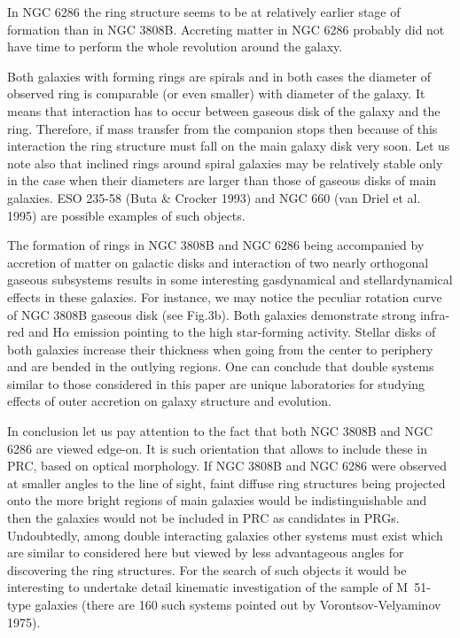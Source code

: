 In NGC 6286 the ring structure seems to be
at relatively earlier stage of formation than in NGC 3808B.
Accreting matter in NGC 6286 probably did not have time to perform 
the whole revolution around the galaxy.

Both galaxies with forming rings are spirals and in both
cases the diameter of observed ring is comparable (or
even smaller) with diameter of the galaxy. It means that
interaction has to occur between gaseous disk of the galaxy
and the ring. Therefore, if mass transfer from the companion
stops then because of this interaction the ring structure
must fall on the main galaxy disk very soon. Let us note also
that inclined rings around spiral galaxies may be relatively
stable only in the case when their diameters are larger than
those of gaseous disks of main galaxies. ESO 235-58 (Buta
\& Crocker 1993) and NGC 660 (van Driel et al. 1995) are
possible examples of such objects. 

The formation of rings in NGC 3808B and NGC 6286 being accompanied by
accretion of matter on galactic disks and interaction of two
nearly orthogonal gaseous subsystems results in some
interesting gasdynamical and stellardynamical effects in
these galaxies. For instance, we may notice the peculiar
rotation curve of NGC 3808B gaseous disk (see Fig.3b). Both
galaxies demonstrate strong infra-red and H$\alpha$
emission pointing to the high star-forming activity.
Stellar disks of both galaxies increase their thickness
when going from the center to periphery and are bended in the
outlying regions. One can conclude that double systems
similar to those considered in this paper are unique laboratories
for studying effects of outer accretion on galaxy structure
and evolution.

In conclusion let us pay attention to the fact that both
NGC 3808B and NGC 6286 are viewed edge-on. It is such orientation
that allows to include these in PRC, based on optical
morphology. If NGC 3808B and NGC 6286 were observed at
smaller angles to the line of sight, faint diffuse ring
structures being projected onto the more bright regions of
main galaxies would be indistinguishable and then the galaxies
would not be included in PRC as candidates in PRGs. Undoubtedly,
among double interacting galaxies other systems must exist
which are similar to considered here but viewed by less
advantageous angles for discovering the ring structures. 
For the search of such objects it would be interesting
to undertake detail kinematic investigation of the sample of
M~51-type galaxies (there are 160 such systems pointed out
by Vorontsov-Velyaminov 1975).

